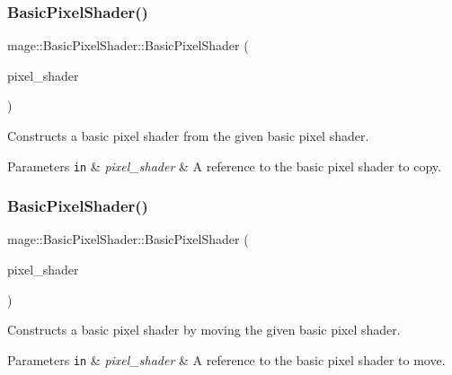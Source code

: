 \subsubsection{\texorpdfstring{Basic\+Pixel\+Shader()}{BasicPixelShader()}\hspace{0.1cm}{\footnotesize\ttfamily [5/6]}}
{\footnotesize\ttfamily mage\+::\+Basic\+Pixel\+Shader\+::\+Basic\+Pixel\+Shader (\begin{DoxyParamCaption}\item[{const \hyperlink{classmage_1_1_basic_pixel_shader}{Basic\+Pixel\+Shader} \&}]{pixel\+\_\+shader }\end{DoxyParamCaption})\hspace{0.3cm}{\ttfamily [delete]}}

Constructs a basic pixel shader from the given basic pixel shader.


\begin{DoxyParams}[1]{Parameters}
\mbox{\tt in}  & {\em pixel\+\_\+shader} & A reference to the basic pixel shader to copy. \\
\hline
\end{DoxyParams}
\hypertarget{classmage_1_1_basic_pixel_shader_a0a5366edb694e78e4c8075fad70b7dff}{}\label{classmage_1_1_basic_pixel_shader_a0a5366edb694e78e4c8075fad70b7dff} 
\subsubsection{\texorpdfstring{Basic\+Pixel\+Shader()}{BasicPixelShader()}\hspace{0.1cm}{\footnotesize\ttfamily [6/6]}}
{\footnotesize\ttfamily mage\+::\+Basic\+Pixel\+Shader\+::\+Basic\+Pixel\+Shader (\begin{DoxyParamCaption}\item[{\hyperlink{classmage_1_1_basic_pixel_shader}{Basic\+Pixel\+Shader} \&\&}]{pixel\+\_\+shader }\end{DoxyParamCaption})\hspace{0.3cm}{\ttfamily [default]}}

Constructs a basic pixel shader by moving the given basic pixel shader.


\begin{DoxyParams}[1]{Parameters}
\mbox{\tt in}  & {\em pixel\+\_\+shader} & A reference to the basic pixel shader to move. \\
\hline
\end{DoxyParams}
\hypertarget{classmage_1_1_basic_pixel_shader_a7b4ac308850eb9ad55cbbd1e6389271b}{}\label{classmage_1_1_basic_pixel_shader_a7b4ac308850eb9ad55cbbd1e6389271b} 

